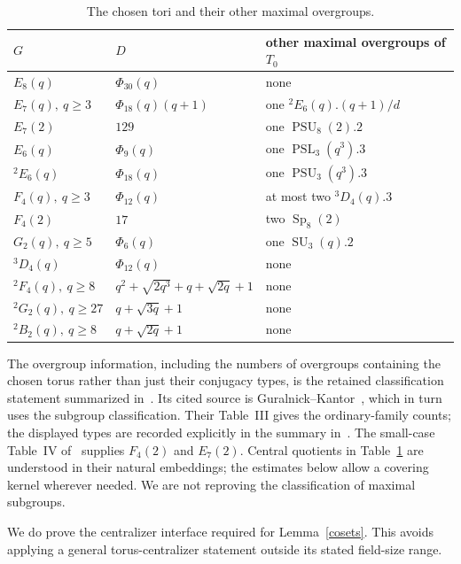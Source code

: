 \documentclass[10pt,a4paper]{article}
\newcommand{\Sp}{\operatorname{Sp}}\newcommand{\SL}{\operatorname{SL}}
\newcommand{\PSL}{\operatorname{PSL}}\newcommand{\PGL}{\operatorname{PGL}}
\begin{document}
\begin{table}[ht]\centering\small
\begin{tabular}{lll}
\toprule
$G$&$D$&other maximal overgroups of $T_0$\\\midrule
$E_8(q)$&$\Phi_{30}(q)$&none\\
$E_7(q),\ q\ge3$&$\Phi_{18}(q)(q+1)$&one ${}^2E_6(q).(q+1)/d$\\
$E_7(2)$&$129$&one $\operatorname{PSU}_8(2).2$\\
$E_6(q)$&$\Phi_9(q)$&one $\PSL_3(q^3).3$\\
$ {}^2E_6(q)$&$\Phi_{18}(q)$&one $\operatorname{PSU}_3(q^3).3$\\
$F_4(q),\ q\ge3$&$\Phi_{12}(q)$&at most two ${}^3D_4(q).3$\\
$F_4(2)$&$17$&two $\Sp_8(2)$\\
$G_2(q),\ q\ge5$&$\Phi_6(q)$&one $\operatorname{SU}_3(q).2$\\
$ {}^3D_4(q)$&$\Phi_{12}(q)$&none\\
$ {}^2F_4(q),\ q\ge8$&$q^2+\sqrt{2q^3}+q+\sqrt{2q}+1$&none\\
$ {}^2G_2(q),\ q\ge27$&$q+\sqrt{3q}+1$&none\\
$ {}^2B_2(q),\ q\ge8$&$q+\sqrt{2q}+1$&none\\\bottomrule
\end{tabular}
\caption{The chosen tori and their other maximal overgroups.}
\label{tori}
\end{table}

The overgroup information, including the numbers of overgroups containing
the chosen torus rather than just their conjugacy types, is the retained
classification statement summarized in~\cite[Table~2]{LL}.
Its cited source is Guralnick--Kantor~\cite[Propositions~6.1--6.2
and their proofs]{GK}, which in turn uses the subgroup classification.
Their Table~III gives the ordinary-family counts; the displayed types
are recorded explicitly in the summary in~\cite{LL}.
The small-case Table~IV of~\cite{GK} supplies $F_4(2)$ and $E_7(2)$.
Central quotients in Table~\ref{tori} are understood in their natural
embeddings; the estimates below allow a covering kernel wherever needed.
We are not reproving the classification of maximal subgroups.

We do prove the centralizer interface required for Lemma~\ref{cosets}.
This avoids applying a general torus-centralizer statement outside its
stated field-size range.
\end{document}
